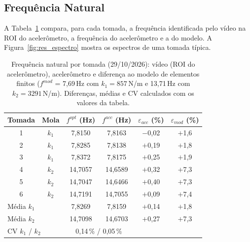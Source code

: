 \documentclass[a4paper,10pt,twocolumn]{article}
\begin{document}
\subsection{Frequência Natural}
\label{sec:res_frequencia}

A Tabela~\ref{tab:res_frequencia} compara, para cada tomada, a frequência identificada pelo vídeo na ROI do acelerômetro, a frequência do acelerômetro e a do modelo. A Figura~\ref{fig:res_espectro} mostra os espectros de uma tomada típica.

\begin{table}[H]
    \centering
    \caption{Frequência natural por tomada (29/10/2026): vídeo (ROI do acelerômetro), acelerômetro e diferença ao modelo de elementos finitos ($f^{mod}$ = 7,69\,Hz com $k_1 = 857$\,N/m e 13,71\,Hz com $k_2 = 3291$\,N/m). Diferenças, médias e CV calculados com os valores da tabela.}
    \label{tab:res_frequencia}
    \small
    \setlength{\tabcolsep}{3.8pt}
    \begin{tabular}{c c c c c c}
        \toprule
        \textbf{Tomada} & \textbf{Mola} & \textbf{$f^{opt}$ (Hz)} & \textbf{$f^{acc}$ (Hz)} & \textbf{$\varepsilon_{acc}$ (\%)} & \textbf{$\varepsilon_{mod}$ (\%)} \\
        \midrule
        1 & $k_1$ & 7,8150 & 7,8163 & $-$0,02 & $+$1,6 \\
        2 & $k_1$ & 7,8285 & 7,8138 & $+$0,19 & $+$1,8 \\
        3 & $k_1$ & 7,8372 & 7,8175 & $+$0,25 & $+$1,9 \\
        4 & $k_2$ & 14,7057 & 14,6589 & $+$0,32 & $+$7,3 \\
        5 & $k_2$ & 14,7047 & 14,6466 & $+$0,40 & $+$7,3 \\
        6 & $k_2$ & 14,7191 & 14,7055 & $+$0,09 & $+$7,4 \\
        \midrule
        \multicolumn{2}{l}{Média $k_1$} & 7,8269 & 7,8159 & $+$0,14 & $+$1,8 \\
        \multicolumn{2}{l}{Média $k_2$} & 14,7098 & 14,6703 & $+$0,27 & $+$7,3 \\
        \multicolumn{2}{l}{CV $k_1$ / $k_2$} & \multicolumn{2}{c}{0,14\,\% / 0,05\,\%} & & \\
        \bottomrule
    \end{tabular}
\end{table}
\end{document}
